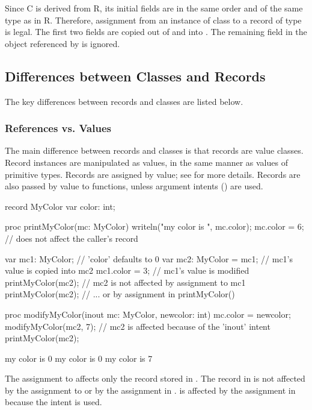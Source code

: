 Since C is derived from R, its initial fields are in the same order and of the
same type as in R.  Therefore, assignment from an instance of class  to
a record of type  is legal.
The first two fields are copied out of  and into .  The
remaining field in the object referenced by  is ignored.


\subsection{Differences between Classes and Records}
\label{Class_and_Record_Differences}

The key differences between records and classes are listed below.

\subsubsection{References vs. Values}
\label{Records_as_Value_Classes}

The main difference between records and classes is that records are
value classes.  Record instances are manipulated as values, in the
same manner as values of primitive types.  Records are assigned by value;
see  for more details.  Records are also passed
by value to functions, unless argument intents () are used.

\begin{example}
\begin{chapelpre}
\end{chapelpre}
\begin{chapel}
record MyColor {
  var color: int;
}

proc printMyColor(mc: MyColor) {
  writeln("my color is ", mc.color);
  mc.color = 6;   // does not affect the caller's record
}

var mc1: MyColor;        // 'color' defaults to 0
var mc2: MyColor = mc1;  // mc1's value is copied into mc2
mc1.color = 3;           // mc1's value is modified
printMyColor(mc2);       // mc2 is not affected by assignment to mc1
printMyColor(mc2);       // ... or by assignment in printMyColor()

proc modifyMyColor(inout mc: MyColor, newcolor: int) {
  mc.color = newcolor;
}
modifyMyColor(mc2, 7);   // mc2 is affected because of the 'inout' intent
printMyColor(mc2);
\end{chapel}
\begin{chapeloutput}
my color is 0
my color is 0
my color is 7
\end{chapeloutput}
The assignment to  affects only the record stored
in . The record in  is not affected by
the assignment to  or by the assignment in .
 is affected by the assignment in 
because the intent  is used.
\end{example}

